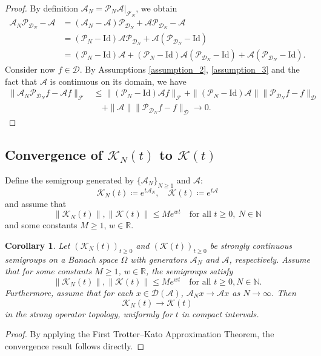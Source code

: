 \documentclass{article}[11]
\newtheorem{corollary}[theorem]{Corollary}
\begin{document}
\begin{proof}
	By definition $\mathcal{A}_N = \mathcal{P}_N \mathcal{A} |_{\mathcal{F}_N}$, we obtain
	\begin{align*}
		\mathcal{A}_N \mathcal{P}_{\mathcal{D}_N} - \mathcal{A} &= (\mathcal{A}_N - \mathcal{A}) \mathcal{P}_{\mathcal{D}_N} + \mathcal{A} \mathcal{P}_{\mathcal{D}_N} - \mathcal{A} \\
		&= (\mathcal{P}_N - \mathrm{Id}) \mathcal{A} \mathcal{P}_{\mathcal{D}_N} + \mathcal{A} (\mathcal{P}_{\mathcal{D}_N} - \mathrm{Id}) \\
		&= (\mathcal{P}_N - \mathrm{Id}) \mathcal{A} + (\mathcal{P}_N - \mathrm{Id}) \mathcal{A} (\mathcal{P}_{\mathcal{D}_N} - \mathrm{Id}) + \mathcal{A} (\mathcal{P}_{\mathcal{D}_N} - \mathrm{Id}).
	\end{align*}	
	Consider now $f \in \mathcal{D}$. By Assumptions \ref{assumption_2}, \ref{assumption_3} and the fact that $\mathcal{A}$ is continuous on its domain, we have
	\begin{align*}
		\| \mathcal{A}_N \mathcal{P}_{\mathcal{D}_N} f - \mathcal{A} f \|_{\mathcal{F}} &\leq \| (\mathcal{P}_N - \mathrm{Id}) \mathcal{A} f \|_{\mathcal{F}} + \| (\mathcal{P}_N - \mathrm{Id}) \mathcal{A} \| \| \mathcal{P}_{\mathcal{D}_N} f - f \|_{\mathcal{D}} \\
		&\quad + \| \mathcal{A} \| \| \mathcal{P}_{\mathcal{D}_N} f - f \|_{\mathcal{D}} \to 0.
	\end{align*}	
\end{proof}




\subsection{Convergence of \(\mathcal{K}_N(t)\) to \(\mathcal{K}(t)\)}

Define the semigroup generated by $\{\mathcal{A}_N\}_{N \geq 1}$ and $\mathcal{A}$:
$$
\mathcal{K}_N(t) \coloneqq e^{t\mathcal{A}_N}, \quad \mathcal{K}(t) \coloneqq e^{t\mathcal{A}}
$$
and assume that 
$$
\|\mathcal{K}_N(t)\|, \|\mathcal{K}(t)\| \leq Me^{wt} \quad \textrm{for all } t\geq0, \  N\in\mathbb{N}
$$
and some constants $M \geq 1$, $w \in \mathbb{R}$.

\begin{corollary}
	Let $(\mathcal{K}_N(t))_{t\geq0}$ and $(\mathcal{K}(t))_{t\geq0}$ be strongly continuous semigroups on a Banach space $\Omega$ with generators $\mathcal{A}_N$ and $\mathcal{A}$, respectively. Assume that for some constants $M \geq 1$, $w \in \mathbb{R}$, the semigroups satisfy
	\[
	\|\mathcal{K}_N(t)\|, \|\mathcal{K}(t)\| \leq Me^{wt} \quad \text{for all } t \geq 0, N \in \mathbb{N}.
	\]
	Furthermore, assume that for each $x \in \mathcal{D}(\mathcal{A})$, $\mathcal{A}_N x \to \mathcal{A} x$ as $N \to \infty$. Then 
	$$
	\mathcal{K}_N(t) \to \mathcal{K}(t)
	$$
	in the strong operator topology, uniformly for $t$ in compact intervals.
\end{corollary}
\begin{proof}
	By applying the First Trotter--Kato Approximation Theorem, the convergence result follows directly.
\end{proof}
	
\end{document}
